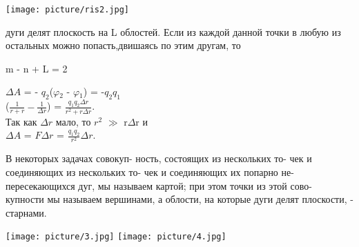 \documentclass{article}
\begin{document}
\begin{multicols}{2}
\begin{small}
\begin{justify}
\parindent0pt
\texttt{[image: picture/ris2.jpg]}


дуги делят плоскость на L облостей.\linebreak
Если из каждой данной точки в любую\linebreak
из остальных можно попасть,двишаясь\linebreak
по этим другам, то\linebreak

\parindent60pt
m - n + L = 2

\parindent15pt
$\Delta A$ = - $q_2$($\varphi$$_2$ - $\varphi$$_1$) = -$q_2$$q_1$\\

\parindent60pt
\indent ($\frac{1}{r + r} - \frac{1}{\Delta r}$) = $\frac{q_1 q_2 \Delta r}{r^2 + r \Delta r}$. \\

\parindent20pt
\indent Так как $\Delta r$ мало, то $r^2$ $\gg$ r$\Delta$r и \\

\parindent45pt
\indent $\Delta A$ = $F \Delta r$ = $\frac{q_1 q_2}{r^2} \Delta r .$ 
\linebreak

\parindent15pt
В некоторых задачах совокуп-\linebreak
ность, состоящих из нескольких то-\linebreak
чек и соединяющих из нескольких то-\linebreak
чек и соединяющих их попарно не-\linebreak
пересекающихся дуг, мы называем\linebreak
картой; при этом точки из этой сово-\linebreak
купности мы называем вершинами,\linebreak
а облости, на которые дуги делят\linebreak
плоскости, - старнами.

\parindent0pt

\texttt{[image: picture/3.jpg]}
\texttt{[image: picture/4.jpg]}

\end{justify}
\end{small}
\end{multicols}
\end{document}
